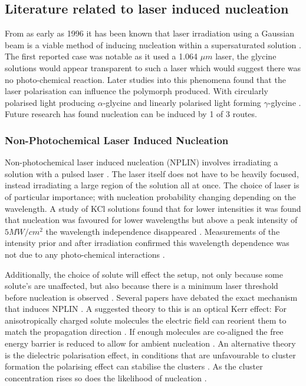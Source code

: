 \subsection{Literature related to laser induced nucleation}
From as early as 1996 it has been known that laser irradiation 
using a Gaussian beam is a viable method of inducing nucleation 
within a supersaturated solution \cite{Garetz1996}. The first 
reported case was notable as it used a 1.064 $\mu m$ laser, the 
glycine solutions would appear transparent to such a laser which 
would suggest there was no photo-chemical reaction. Later studies 
into this phenomena found that the laser polarisation can influence 
the polymorph produced. With circularly polarised light producing 
$\alpha$-glycine and linearly polarised light forming $\gamma$-glycine 
\cite{Garetz2002}. Future research has found nucleation can be 
induced by 1 of 3 routes.

\subsubsection{Non-Photochemical Laser Induced Nucleation}
Non-photochemical laser induced nucleation (NPLIN) involves 
irradiating a solution with a pulsed laser \cite{Garetz1996,
Garetz2002,Sun2006}. The laser itself does not have to be 
heavily focused, instead irradiating a large region of the 
solution all at once. The choice of laser is of particular 
importance; with nucleation probability changing depending 
on the wavelength. A study of KCl solutions found that for 
lower intensities it was found that nucleation was favoured 
for lower wavelengths but above a peak intensity of $5 MW/
cm^2$ the wavelength independence disappeared \cite{Kacker2017}. 
Measurements of the intensity prior and after irradiation 
confirmed this wavelength dependence was not due to any 
photo-chemical interactions \cite{Kacker2017}.

Additionally, the choice of solute will effect the setup, not 
only because some solute's are unaffected, but also because 
there is a minimum laser threshold before nucleation is observed 
\cite{Garetz2002}. Several papers have debated the exact mechanism 
that induces NPLIN \cite{Garetz2002, Knott2011}. A suggested 
theory to this is an optical Kerr effect: For anisotropically 
charged solute molecules the electric field can reorient them 
to match the propagation direction \cite{Garetz2002}. If enough 
molecules are co-aligned the free energy barrier is reduced to 
allow for ambient nucleation \cite{Knott2011}. An alternative 
theory is the dielectric polarisation effect, in conditions that 
are unfavourable to cluster formation the polarising effect can 
stabilise the clusters \cite{Alexander2008}. As the cluster 
concentration rises so does the likelihood of nucleation 
\cite{Vekilov2010}. 


